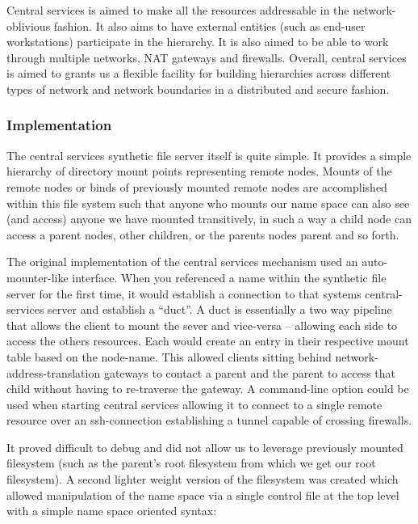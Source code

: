 Central services is aimed to make all the resources addressable in the
network-oblivious fashion.  It also aims to have external entities
(such as end-user workstations) participate in the hierarchy.  It is also aimed
to be able to work through multiple networks, NAT gateways and firewalls. 
Overall, central services is aimed to grants us a flexible facility for
building hierarchies across different types of network and network
boundaries in a distributed and secure fashion.

\subsubsection{Implementation}
The central services synthetic file server itself is quite
simple.  It provides a simple hierarchy of directory mount points
representing remote nodes.  Mounts of the remote nodes or binds of
previously mounted remote nodes are accomplished within this file
system such that anyone who mounts our name space can also see (and
access) anyone we have mounted transitively,  in such a way a child
node can access a parent nodes, other children, or the parents nodes
parent and so forth.


The original implementation of the central services mechanism used an
auto-mounter-like interface.  When you referenced a name within the
synthetic file server for the first time, it would establish a
connection to that systems central-services server and establish a
“duct”.  A duct is essentially a two way pipeline that allows the
client to mount the sever and vice-versa -- allowing each side to
access the others resources.   Each would create an entry in their
respective mount table based on the node-name.  This allowed clients
sitting behind network-address-translation gateways to contact a
parent and the parent to access that child without having to
re-traverse the gateway.  A command-line option could be used when
starting central services allowing it to connect to a single remote
resource over an ssh-connection establishing a tunnel capable of
crossing firewalls.


It proved difficult to debug and did not allow us to leverage
previously mounted filesystem (such as the parent's root filesystem
from which we get our root filesystem).  A second lighter weight
version of the filesystem was created which allowed manipulation of
the name space via a single control file at the top level with a
simple name space oriented syntax:

